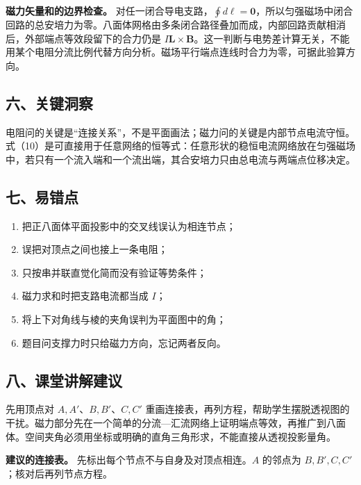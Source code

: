 \documentclass[12pt,a4paper,UTF8]{ctexart}
\newcommand{\tightlist}{\setlength{\itemsep}{0pt}\setlength{\parskip}{0pt}}
\begin{document}
\textbf{磁力矢量和的边界检查。}
对任一闭合导电支路，\(\oint d\boldsymbol\ell=\boldsymbol0\)，所以匀强磁场中闭合回路的总安培力为零。八面体网格由多条闭合路径叠加而成，内部回路贡献相消后，外部端点等效段留下的合力仍是
\(I\boldsymbol L\times\boldsymbol B\)。这一判断与电势差计算无关，不能用某个电阻分流比例代替方向分析。磁场平行端点连线时合力为零，可据此验算方向。

\subsection{六、关键洞察}\label{ux516dux5173ux952eux6d1eux5bdf-4}

电阻问的关键是``连接关系''，不是平面画法；磁力问的关键是内部节点电流守恒。式（10）是可直接用于任意网络的恒等式：任意形状的稳恒电流网络放在匀强磁场中，若只有一个流入端和一个流出端，其合安培力只由总电流与两端点位移决定。

\subsection{七、易错点}\label{ux4e03ux6613ux9519ux70b9-4}

\begin{enumerate}
\def\labelenumi{\arabic{enumi}.}
\tightlist
\item
  把正八面体平面投影中的交叉线误认为相连节点；
\item
  误把对顶点之间也接上一条电阻；
\item
  只按串并联直觉化简而没有验证等势条件；
\item
  磁力求和时把支路电流都当成 \(I\)；
\item
  将上下对角线与棱的夹角误判为平面图中的角；
\item
  题目问支撑力时只给磁力方向，忘记两者反向。
\end{enumerate}

\subsection{八、课堂讲解建议}\label{ux516bux8bfeux5802ux8bb2ux89e3ux5efaux8bae-4}

先用顶点对 \(A,A'\)、\(B,B'\)、\(C,C'\)
重画连接表，再列方程，帮助学生摆脱透视图的干扰。磁力部分先在一个简单的分流---汇流网络上证明端点等效，再推广到八面体。空间夹角必须用坐标或明确的直角三角形求，不能直接从透视投影量角。

\textbf{建议的连接表。} 先标出每个节点不与自身及对顶点相连。\(A\)
的邻点为 \(B,B\prime,C,C\prime\)；核对后再列节点方程。
\end{document}
